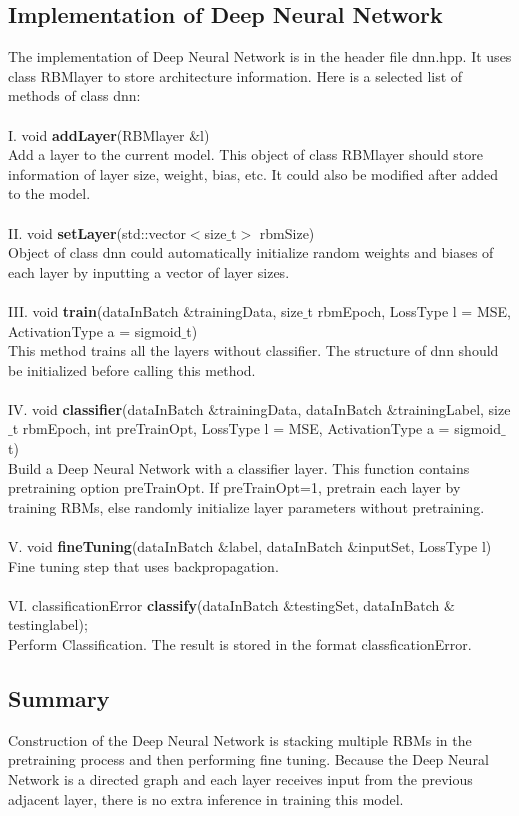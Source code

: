 \documentclass[12pt]{article}
\begin{document}
\subsection{Implementation of Deep Neural Network}
The implementation of Deep Neural Network is in the header file dnn.hpp. It uses class RBMlayer to store architecture information. Here is a selected list of methods of class dnn:\\
\\
I. void \textbf{addLayer}(RBMlayer $\&$l)\\
Add a layer to the current model. This object of class RBMlayer should store information of layer size, weight, bias, etc. It could also be modified after added to  the model.\\
\\
II. void \textbf{setLayer}(std::vector$<$size$\_$t$>$ rbmSize)\\
Object of class dnn could automatically initialize random weights and biases of each layer by inputting a vector of layer sizes.\\
\\
III. void \textbf{train}(dataInBatch $\&$trainingData, size$\_$t rbmEpoch, LossType l = MSE, ActivationType a = sigmoid$\_$t)\\
This method trains all the layers without classifier. The structure of dnn should be initialized before calling this method. \\
\\
IV. void \textbf{classifier}(dataInBatch $\&$trainingData, dataInBatch $\&$trainingLabel, size$\_$t rbmEpoch, int preTrainOpt, LossType l = MSE, ActivationType a = sigmoid$\_$t)\\
Build a Deep Neural Network with a classifier layer. This function contains pretraining option preTrainOpt. If preTrainOpt=1, pretrain each layer by training RBMs, else randomly initialize layer parameters without pretraining.\\
\\
V. void \textbf{fineTuning}(dataInBatch $\&$label, dataInBatch $\&$inputSet, LossType l)\\
Fine tuning step that uses backpropagation.\\
\\
VI. classificationError \textbf{classify}(dataInBatch $\&$testingSet, dataInBatch $\&$testinglabel);\\
Perform Classification. The result is stored in the format classficationError.
\subsection{Summary}
Construction of the Deep Neural Network is stacking multiple RBMs in the pretraining process and then performing fine tuning. Because the Deep Neural Network is a directed graph and each layer receives input from the previous adjacent layer, there is no extra inference in training this model.
\clearpage
\end{document}
